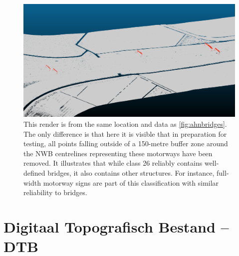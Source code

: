 \begin{figure}[h]
    \centering
    \includegraphics[width=\linewidth]{p2/figs/ahn_sample_02.png} 
    \caption{This render is from the same location and data as \ref{fig:ahnbridges}. The only difference is that here it is visible that in preparation for testing, all points falling outside of a 150-metre buffer zone around the NWB centrelines representing these motorways have been removed. It illustrates that while class 26 reliably contains well-defined bridges, it also contains other structures. For instance, full-width motorway signs are part of this classification with similar reliability to bridges.}
    \label{fig:ahnsigns}
\end{figure}

\section*{Digitaal Topografisch Bestand – DTB}

